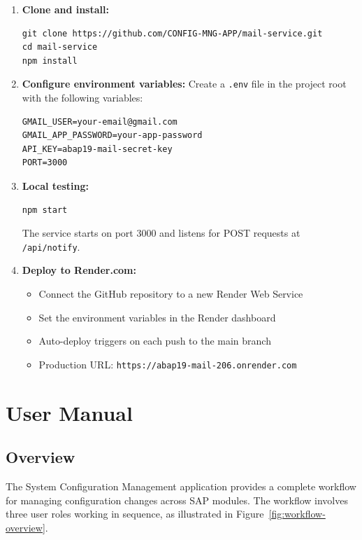 \documentclass[12pt,a4paper]{report}
\begin{document}
\begin{enumerate}[leftmargin=2em]
  \item \textbf{Clone and install:}
\begin{lstlisting}
git clone https://github.com/CONFIG-MNG-APP/mail-service.git
cd mail-service
npm install
\end{lstlisting}

  \item \textbf{Configure environment variables:}
    Create a \texttt{.env} file in the project root with the following variables:
\begin{lstlisting}
GMAIL_USER=your-email@gmail.com
GMAIL_APP_PASSWORD=your-app-password
API_KEY=abap19-mail-secret-key
PORT=3000
\end{lstlisting}

  \item \textbf{Local testing:}
\begin{lstlisting}
npm start
\end{lstlisting}
    The service starts on port 3000 and listens for POST requests at \texttt{/api/notify}.

  \item \textbf{Deploy to Render.com:}
    \begin{itemize}
      \item Connect the GitHub repository to a new Render Web Service
      \item Set the environment variables in the Render dashboard
      \item Auto-deploy triggers on each push to the main branch
      \item Production URL: \texttt{https://abap19-mail-206.onrender.com}
    \end{itemize}
\end{enumerate}


\section{User Manual}

\subsection{Overview}

The System Configuration Management application provides a complete workflow for managing configuration changes across SAP modules. The workflow involves three user roles working in sequence, as illustrated in Figure~\ref{fig:workflow-overview}.
\end{document}
